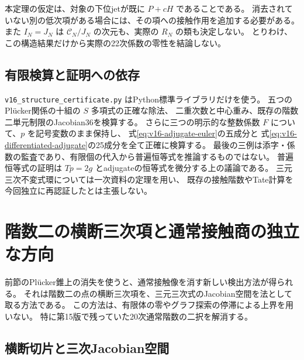 \begin{remark}[適用範囲]
本定理の仮定は、対象の下位jetが既に $P+cH$ であることである。
消去されていない別の低次項がある場合には、その項への接触作用を追加する必要がある。
また $I_N=J_N$ は $\mathcal C_N/J_N$ の次元も、実際の $R_N$ の類も決定しない。
とりわけ、この構造結果だけから実際の22次係数の零性を結論しない。
\end{remark}

\subsection{有限検算と証明への依存}

\nolinkurl{v16_structure_certificate.py} はPython標準ライブラリだけを使う。
五つのPl\"ucker関係の十組の $S$ 多項式の正確な除法、
二重次数と中心重み、既存の階数二単元制限のJacobian36を検算する。
さらに三つの明示的な整数係数 $F$ について、$p$ を記号変数のまま保持し、
式\eqref{eq:v16-adjugate-euler}の五成分と
式\eqref{eq:v16-differentiated-adjugate}の25成分を全て正確に検算する。
最後の三例は添字・係数の監査であり、有限個の代入から普遍恒等式を推論するものではない。
普遍恒等式の証明は $Tp=2g$ とadjugateの恒等式を微分する上の議論である。
三元三次不変式環については一次資料の定理を用い、
既存の接触階数やTate計算を今回独立に再認証したとは主張しない。




\section{階数二の横断三次項と通常接触商の独立な方向}
\label{sec:v16-normal-slice-injection}

前節のPl\"ucker錐上の消失を使うと、通常接触像を消す新しい検出方法が得られる。
それは階数二の点の横断三次項を、三元三次式のJacobian空間を法として取る方法である。
この方法は、有限体の零やグラフ探索の停滞による上界を用いない。
特に第15版で残っていた20次通常階数の二択を解消する。

\subsection{横断切片と三次Jacobian空間}

